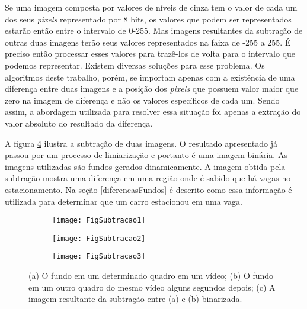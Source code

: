     Se uma imagem composta por valores de níveis de cinza tem o valor de cada um dos seus \textit{pixels} representado por 8 bits, os valores que podem ser representados estarão então entre o intervalo de 0-255. Mas imagens resultantes da subtração de outras duas imagens terão seus valores representados na faixa de -255 a 255. É preciso então processar esses valores para trazê-los de volta para o intervalo que podemos representar. Existem diversas soluções para esse problema. Os algoritmos deste trabalho, porém, se importam apenas com a existência de uma diferença entre duas imagens e a posição dos \textit{pixels} que possuem valor maior que zero na imagem de diferença e não os valores específicos de cada um. Sendo assim, a abordagem utilizada para resolver essa situação foi apenas a extração do valor absoluto do resultado da diferença.

    A figura \ref{SubtracaoFig} ilustra a subtração de duas imagens. O resultado apresentado já passou por um processo de limiarização e portanto é uma imagem binária. As imagens utilizadas são fundos gerados dinamicamente. A imagem obtida pela subtração mostra uma diferença em uma região onde é sabido que há vagas no estacionamento. Na seção \ref{diferencasFundos} é descrito como essa informação é utilizada para determinar que um carro estacionou em uma vaga.



    \begin{figure}
 \centering
\begin{subfigure}{.5\textwidth}
  \centering
  \texttt{[image: FigSubtracao1]}
  \caption{}
  \label{Subtracao:sfig1}
\end{subfigure}%
\begin{subfigure}{.5\textwidth}
  \centering
  \texttt{[image: FigSubtracao2]}
  \caption{}
  \label{Subtracao:sfig2}
\end{subfigure}


\begin{subfigure}{.5\textwidth}
  \centering
  \texttt{[image: FigSubtracao3]}
  \caption{}
  \label{Subtracao:sfig3}
\end{subfigure}
\caption{(a) O fundo em um determinado quadro em um vídeo; (b) O fundo em um outro quadro do mesmo vídeo alguns segundos depois; (c) A imagem resultante da subtração entre (a) e (b) binarizada.}
\label{SubtracaoFig}
\end{figure}



